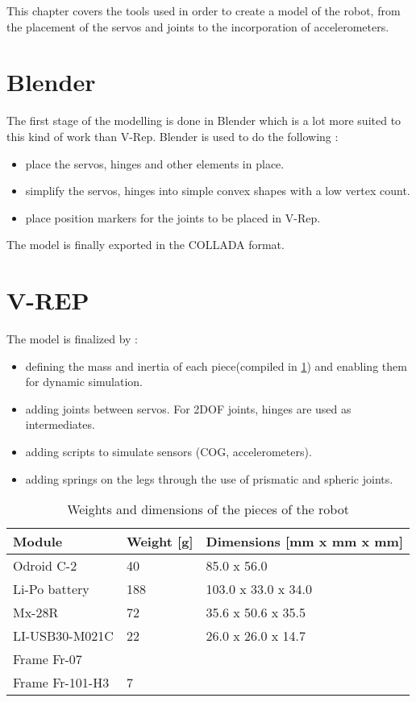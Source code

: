 This chapter covers the tools used in order to create a model of the robot, from the placement of the servos and joints to the incorporation of accelerometers.

\section{Blender}
The first stage of the modelling is done in Blender which is a lot more suited to this kind of work than V-Rep. 
Blender is used to do the following :
\begin{itemize}
\item place the servos, hinges and other elements in place.
\item simplify the servos, hinges into simple convex shapes with a low vertex count.
\item place position markers for the joints to be placed in V-Rep.
\end{itemize}

The model is finally exported in the COLLADA format.

\section{V-REP}
The model is finalized by :
\begin{itemize}
\item defining the mass and inertia of each piece(compiled in \cref{table:weights}) and enabling them for dynamic simulation.
\item adding joints between servos. For 2DOF joints, hinges are used as intermediates.
\item adding scripts to simulate sensors (COG, accelerometers).
\item adding springs on the legs through the use of prismatic and spheric joints.
\end{itemize}

\begin{table}[htp]
\center
\begin{tabularx}{\textwidth}{@{} X X l @{}}
\toprule
\textbf{Module} & \textbf{Weight [g]} & \textbf{Dimensions [mm x mm x mm]}\\ 
\midrule
Odroid C-2 & 40 & 85.0 x 56.0\\
Li-Po battery & 188 & 103.0 x 33.0 x 34.0\\
Mx-28R & 72 & 35.6 x 50.6 x 35.5\\
LI-USB30-M021C & 22 & 26.0 x 26.0 x 14.7\\
Frame Fr-07 & & \\
Frame Fr-101-H3 & 7 & \\
\bottomrule
\end{tabularx}
\caption{Weights and dimensions of the pieces of the robot}
\label{table:weights}
\end{table}

